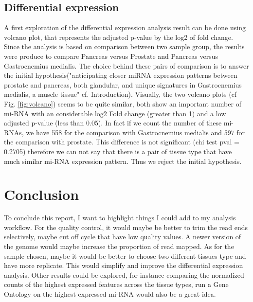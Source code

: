 \documentclass[a4paper, 11pt]{article}
\begin{document}
\begin{multicols}{2}
\subsection{Differential expression}
A first exploration of the differential expression analysis result can be done using volcano plot, that represents the adjusted p-value by the log2 of fold change. Since the analysis is based on comparison between two sample group, the results were produce to compare Pancreas versus Prostate and Pancreas versus Gastrocnemius medialis. The choice behind these pairs of comparison is to answer the initial hypothesis("anticipating closer miRNA expression patterns between prostate and pancreas, both glandular, and unique signatures in Gastrocnemius medialis, a muscle tissue" cf. Introduction). Visually, the two volcano plots (cf Fig. \ref{fig:volcano}) seems to be quite similar, both show an important number of mi-RNA with an considerable log2 Fold change (greater than 1) and a low adjusted p-value (less than 0.05). In fact if we count the number of these mi-RNAs, we have 558 for the comparison with Gastrocnemius medialis and 597 for the comparison with prostate. This difference is not significant (chi test pval = 0.2705) therefore we can not say that there is a pair of tissue type that have much similar mi-RNA expression pattern. Thus we reject the initial hypothesis.

\section{Conclusion}

To conclude this report, I want to highlight things I could add to my analysis workflow. 
For the quality control, it would maybe be better to trim the read ends selectively, maybe cut off cycle that have low quality values. A newer version of the genome would maybe increase the proportion of read mapped. As for the sample chosen, maybe it would be better to choose two different tissues type and have more replicate. This would simplify and improve the differential expression analysis. Other results could be explored, for instance comparing the normalized counts of the highest expressed features across the tissue types, run a Gene Ontology on the highest expressed mi-RNA would also be a great idea.


\end{multicols}
\end{document}
